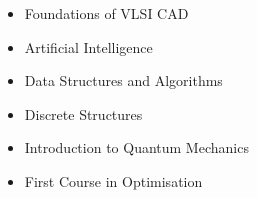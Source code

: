 \documentclass[a4paper,11pt]{article}
\newcommand{\isep}{-2 pt}
\newcommand{\resheading}[1]{{\small \colorbox{mygrey}{\begin{minipage}{0.975\textwidth}{\textbf{#1 \vphantom{p\^{E}}}}\end{minipage}}}}
\begin{document}
\begin{itemize}\itemsep \isep
    \item Foundations of VLSI CAD 
    \item Artificial Intelligence 
    \item Data Structures and Algorithms 
    \item Discrete Structures
    \item Introduction to Quantum Mechanics
    \item First Course in Optimisation
\end{itemize}

\begin{comment}
\resheading{\large{Courses}}
{\renewcommand{\arraystretch}{1.5}
\begin{tabular}{|l|c|l|c|}
\hline
\multicolumn{4}{|c|}{\bfseries Electrical and Electronics}\\
\hline
Course & Grade & Course & Grade \\
\hline
Introduction to Electrical Systems &8 & Introduction to Electronics &10 \\
\hline
Network theory  &8 & Electronic Devices and Circuits  &7 \\
\hline
Signals and Systems  &7 & Electrical Machines and Power Electronics &7  \\
\hline
Digital Systems  &10 & Analog Circuits  &10 \\
\hline
Electromagnetic Waves  &NA & Communication Systems  &NA \\
\hline
Microprocessors  &NA & Probability and Random Processes  &NA \\
\hline
Control Systems  &NA & Digital Signal Processing  &NA \\
\hline
Power Systems  &NA & Digital Communications  &NA \\
\hline
System Design &NA & Testing and Verification of VLSI Circuits  &NA\\
\hline
A first course in optimization  &9 & Foundation of VLSI CAD  & NA \\
\hline
\multicolumn{2}{|c}{\bfseries Computer Science} &
\multicolumn{2}{c|}{\bfseries Mathematics} \\
\hline
Computer Programming and Utilization  &10 & Calculus  &10 \\
\hline
Data Structures and Algorithms  &NA & Linear Algebra  &8 \\
\hline
Discrete Structures  &6 &  Differential Equations I  &7 \\
\hline
Artificial Intelligence  &NA & Differential Equations II  &7 \\

\end{comment}
\end{document}
